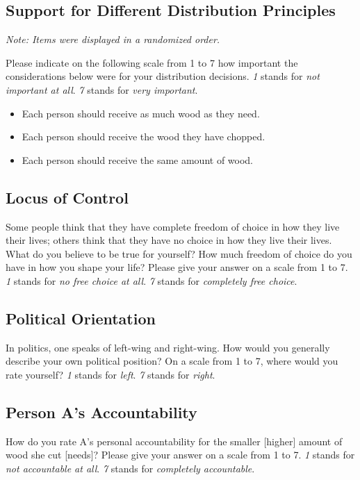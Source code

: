 \documentclass[smallcondensed]{svjour3}
\begin{document}
\subsection*{Support for Different Distribution Principles}
%
\noindent\textit{Note: Items were displayed in a randomized order.}\par
%
\vspace{1ex}
\noindent Please indicate on the following scale from 1 to 7 how important the considerations below were for your distribution decisions. \textit{1} stands for \textit{not important at all}. \textit{7} stands for \textit{very important}.
%
\begin{itemize}
   \item Each person should receive as much wood as they need.
   \item Each person should receive the wood they have chopped.
   \item Each person should receive the same amount of wood.
\end{itemize}
\par
%
\subsection*{Locus of Control}
%
Some people think that they have complete freedom of choice in how they live their lives; others think that they have no choice in how they live their lives. What do you believe to be true for yourself? How much freedom of choice do you have in how you shape your life? Please give your answer on a scale from 1 to 7. \textit{1} stands for \textit{no free choice at all}. \textit{7} stands for \textit{completely free choice}.\par
%
\subsection*{Political Orientation}
%
In politics, one speaks of left-wing and right-wing. How would you generally describe your own political position? On a scale from 1 to 7, where would you rate yourself? \textit{1} stands for \textit{left}. \textit{7} stands for \textit{right}.\par
%
\subsection*{Person A's Accountability}
%
How do you rate A's personal accountability for the smaller [higher] amount of wood she cut [needs]? Please give your answer on a scale from 1 to 7. \textit{1} stands for \textit{not accountable at all}. \textit{7} stands for \textit{completely accountable}.\par
%
\end{document}
